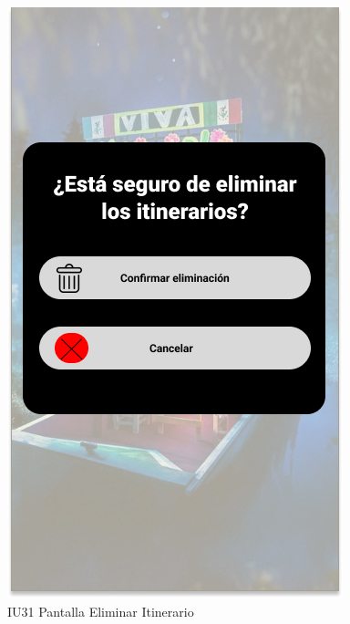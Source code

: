 \begin{figure}[h]
    \begin{minipage}{0.5\textwidth}
        \centering
        \includegraphics[width=.7\linewidth]{Pantallas Prototipo3/IU31 Pantalla Eliminar Itinerario.jpg}
        \caption{IU31 Pantalla Eliminar Itinerario}
    \end{minipage}
    

\end{figure}
